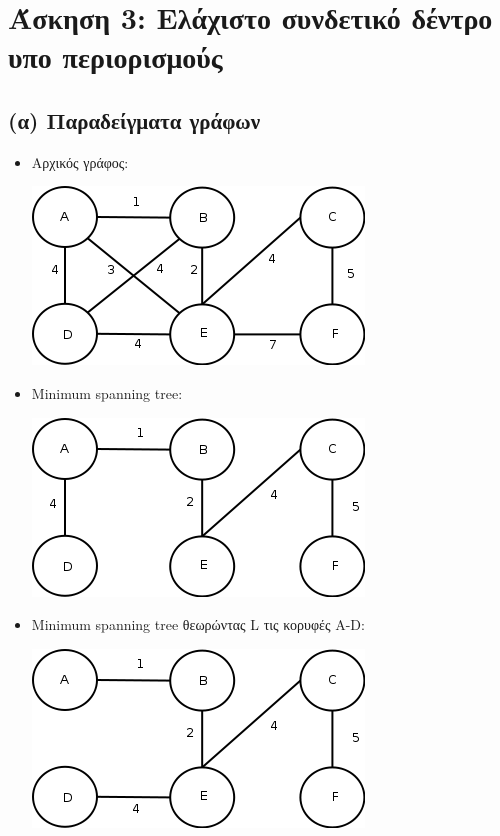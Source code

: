 \documentclass[a4paper,12pt]{report}
\begin{document}
\section*{Άσκηση 3: Ελάχιστο συνδετικό δέντρο υπο περιορισμούς}
\subsection*{(α) Παραδείγματα γράφων}
\begin{itemize}
 \item Αρχικός γράφος: 
  \begin{center}
    \includegraphics[scale=0.5]{./files/ex3-graph.png}
  \end{center}
 \item Minimum spanning tree: 
  \begin{center}
    \includegraphics[scale=0.5]{./files/ex3-alt-mst.png}
  \end{center}
 \item Minimum spanning tree θεωρώντας L τις κορυφές A-D: 
  \begin{center}
    \includegraphics[scale=0.5]{./files/ex3-mst.png}
  \end{center}
\end{itemize}
\end{document}
